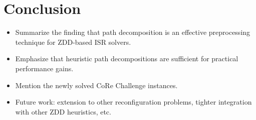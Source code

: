 \documentclass[conference]{IEEEtran}
\newcommand{\KJ}[2]{{\color{red} #2}}
\begin{document}

\section{Conclusion}
\label{sec:conclusion}
\begin{itemize}
\item Summarize the finding that path decomposition is an effective preprocessing technique for ZDD-based ISR solvers.
\item Emphasize that heuristic path decompositions are sufficient for practical performance gains.
\item Mention the newly solved CoRe Challenge instances.
\item Future work: extension to other reconfiguration problems, tighter integration with other ZDD heuristics, etc.
\end{itemize}



\end{document}
